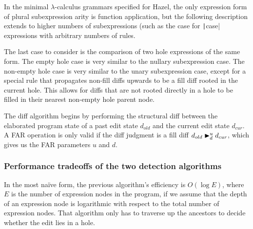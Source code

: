 In the minimal $\lambda$-calculus grammars specified for Hazel, the only expression form of plural subexpression arity is function application, but the following description extends to higher numbers of subexpressions (such as the case for \texttt|case| expressions with arbitrary numbers of rules.

The last case to consider is the comparison of two hole expressions of the same form. The empty hole case is very similar to the nullary subexpression case. The non-empty hole case is very similar to the unary subexpression case, except for a special rule that propagates non-fill diffs upwards to be a fill diff rooted in the current hole. This allows for diffs that are not rooted directly in a hole to be filled in their nearest non-empty hole parent node.

\begin{singlespace}
\end{singlespace}


The diff algorithm begins by performing the structural diff between the elaborated program state of a past edit state $d_{old}$ and the current edit state $d_{cur}$. A FAR operation is only valid if the diff judgment is a fill diff $\fdiff{d_{old}}{d_{cur}}{u}{d}$, which gives us the FAR parameters $u$ and $d$.

\subsubsection{Performance tradeoffs of the two detection algorithms}
\label{sec:far-detect-compare}

In the most na\"ive form, the previous algorithm's efficiency is $O(\log E)$, where $E$ is the number of expression nodes in the program, if we assume that the depth of an expression node is logarithmic with respect to the total number of expression nodes. That algorithm only has to traverse up the ancestors to decide whether the edit lies in a hole.

